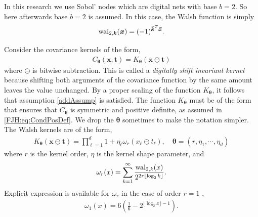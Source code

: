 \documentclass{iitthesis}          %
\newcommand{\bm}[1]{\boldsymbol{#1}}
\newcommand{\vtheta}{{\bm{\theta}}}
\newcommand{\vk}{\bm{k}}
\newcommand{\vt}{\bm{t}}
\newcommand{\vx}{\bm{x}}
\newcommand{\JRNote}[1]{}
\begin{document}
In this research we use Sobol' nodes which are digital nets with base $b=2$. So here afterwards base $b=2$ is assumed. %
In this case, the Walsh function is simply $$\textup{wal}_{2,\vk} (\vx) = (-1)^{\vec{\vk}^T \vec{\vx}}.$$

Consider the covariance kernels of the form,
\begin{align}
\label{eqn:digital_shift_in_kernel}
C_{\vtheta}(\vx, \vt) = K_{\vtheta} (\vx \ominus \vt) 
\end{align}
where $\ominus$ is bitwise subtraction.
This is called a \emph{digitally shift invariant kernel} because shifting both arguments of the covariance function by the same amount leaves the value unchanged. By a proper scaling of the function $K_{\vtheta}$, it follows that assumption \eqref{addAssump} is satisfied. The function $K_{\vtheta}$ must be of the form that ensures that $C_{\vtheta}$ is symmetric and positive definite, as assumed in \eqref{FJH:eq:CondPosDef}. We drop the ${\vtheta}$ sometimes to make the notation simpler.
The Walsh kernels are of the form,
\begin{align}
\label{eqn:walsh_kernel}
K_{\vtheta} (\vx \ominus \vt) =  
\prod_{\ell=1}^d  1 + \eta_\ell \omega_{r} (x_\ell \ominus t_\ell), \quad \vtheta = (r, \eta_1, \cdots, \eta_d)
\end{align}
where $r$ is the kernel order, $\eta$ is the kernel shape parameter, and
\begin{align*}
\omega_r(x) = \sum_{k=1}^\infty 
\frac{\textup{wal}_{2,k}(x) }{2^{2r \lfloor \log_2 k \rfloor}}.
\end{align*}
Explicit expression is available for $\omega_{r}$ in the case of order $r=1$ \cite{Nuyens2013}, %
\begin{align}
\label{eqn:omega1}
\omega_1(x) 
 = 6\left( \frac 16 - 2^{\lfloor \log_2 x \rfloor -1 }\right).
\end{align}
\end{document}
